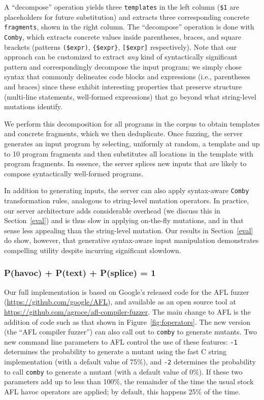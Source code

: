 A ``decompose'' operation yields three \texttt{templates} in the left column
({\tt\color{dkgreen}\$1} are placeholders for future substitution) and extracts
three corresponding concrete \texttt{fragments}, shown in the right column. 
The ``decompose'' operation is done with \texttt{Comby}, which extracts concrete
values inside parentheses, braces, and square brackets (patterns
\texttt{(\$expr)}, \texttt{\{\$expr\}}, \texttt{[\$expr]} respectively). Note
that our approach can be customized to extract \emph{any} kind of syntactically
significant pattern and correspondingly decompose the input program; we simply
chose syntax that commonly delineates code blocks and expressions (i.e.,
parentheses and braces) since these exhibit interesting properties that
preserve structure (multi-line statements, well-formed expressions) that go
beyond what string-level mutations identify.

We perform this decomposition for all programs in the corpus to obtain
templates and concrete fragments, which we then deduplicate. Once fuzzing, the
server generates an input program by selecting, uniformly at random, a template
and up to 10 program fragments and then substitutes all locations in the
template with program fragments. In essence, the server splices new inputs that
are likely to compose syntactically well-formed programs.

In addition to generating inputs, the server can also apply syntax-aware
\texttt{Comby} transformation rules, analogous to string-level mutation
operators. In practice, our server architecture adds considerable overhead (we
discuss this in Section~\ref{eval}) and is thus slow in applying
on-the-fly mutations, and in that sense less
appealing than the string-level mutation. Our
results in Section~\ref{eval} do show, however, that generative
syntax-aware input manipulation demonstrates compelling utility despite
incurring significant slowdown.

\subsubsection{P(havoc) + P(text) + P(splice) = 1}

Our full implementation is based on Google's released code for the AFL
fuzzer (\url{https://github.com/google/AFL}), and available as an open
source tool at \url{https://github.com/agroce/afl-compiler-fuzzer}.  The main change to AFL is the addition of code such as that shown in
Figure~\ref{fig:foperators}.  The new version (the ``AFL compiler
fuzzer'') can also call out to {\tt comby} to generate mutants.  Two
new command line parameters to AFL control the use of these features:
{\tt -1} determines the probability to generate a mutant using the
fast C string implementation (with a default value of 75\%), and {\tt -2} determines the probability
to call {\tt comby} to generate a mutant (with a default value of
0\%).  If these two parameters add up to less than 100\%, the
remainder of the time the usual stock AFL havoc operators are
applied; by default, this happens 25\% of the time.
